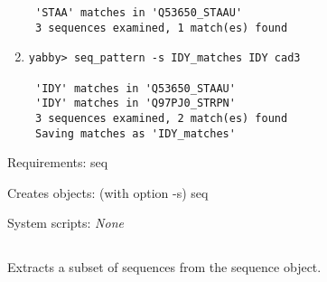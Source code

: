 \begin{description}
\begin{enumerate}
\begin{verbatim}
 'STAA' matches in 'Q53650_STAAU'
 3 sequences examined, 1 match(es) found

\end{verbatim}

\item
\begin{verbatim}
yabby> seq_pattern -s IDY_matches IDY cad3

 'IDY' matches in 'Q53650_STAAU'
 'IDY' matches in 'Q97PJ0_STRPN'
 3 sequences examined, 2 match(es) found
 Saving matches as 'IDY_matches'

\end{verbatim}

\end{enumerate}


\item{Requirements:} seq


\item{Creates objects:} (with option -s) seq


\item{System scripts:} {\em None}

\end{description}



\subsection[seq\_pick]{  }



Extracts a subset of sequences from the sequence object.


